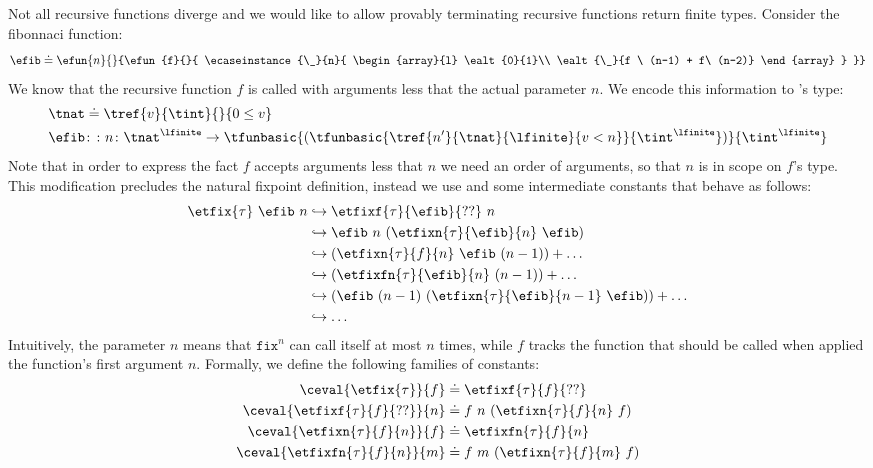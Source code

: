 %
Not all recursive functions diverge
and we would like to allow provably terminating 
recursive functions return finite types.
%
Consider the fibonnaci function:
$$
\efib \doteq
\efun{n}{}{\efun{f}{}{
	\ecaseinstance{\_}{n}{
		 \begin{array}{l}
			 \ealt{0}{1}\\ 
			 \ealt{\_}{f \ (n-1) + f\ (n-2)}	
		\end{array}
	}
}}$$
We know that the recursive function $f$ 
is called with arguments less that the actual parameter $n$.
We encode this information to \efib 's type: 
\begin{align*}
\tnat &\doteq \tref{v}{\tint}{}{0 \leq v}\\
\efib &\colon\colon n\colon\tnat^\lfinite
	\rightarrow
		\tfunbasic{(\tfunbasic{\tref{n'}{\tnat}{\lfinite}{v < n}}{\tint^\lfinite})}
			{\tint^\lfinite}
\end{align*}
%
Note that in order to express the fact $f$ accepts arguments less that 
$n$ we need an order of arguments, so that $n$ is in scope on $f$'s type.
%
This modification precludes the natural fixpoint definition, 
instead we use \etfix{\tau} and some intermediate constants
that behave as follows:
%
\begin{align*}
\etfix{\tau}\ \efib\ n 
& \hookrightarrow
	\etfixf{\tau}{\efib}{??}\ n \\
& \hookrightarrow
    \efib\ n\ (\etfixn{\tau}{\efib}{n}\ \efib) \\
& \hookrightarrow
    (\etfixn{\tau}{f}{n}\ \efib \ (n-1))  + \dots \\
& \hookrightarrow
    (\etfixfn{\tau}{\efib}{n}\ (n-1)) + \dots \\
& \hookrightarrow
    (\efib\ (n-1)\ (\etfixn{\tau}{\efib}{n-1}\ \efib)) 
    +\dots \\
& \hookrightarrow \dots
\end{align*}
%
Intuitively, 
the parameter $n$
means that $\mathtt{fix}^n$ can call itself 
at most $n$ times, 
while $f$ tracks the function that should 
be called when applied the function's 
first argument $n$.
%
Formally,  we define the following families of constants:
\begin{align*}
\ceval{\etfix{\tau}}{f} & \doteq \etfixf{\tau}{f}{??}\\ 
\ceval{\etfixf{\tau}{f}{??}}{n} &\doteq
f\ n\ (\etfixn{\tau}{f}{n}\ f) \\
\ceval{\etfixn{\tau}{f}{n}}{f} & \doteq
    \etfixfn{\tau}{f}{n}\\
\ceval{\etfixfn{\tau}{f}{n}}{m} &\doteq
f\ m\ (\etfixn{\tau}{f}{m}\ f) \\
\end{align*}
